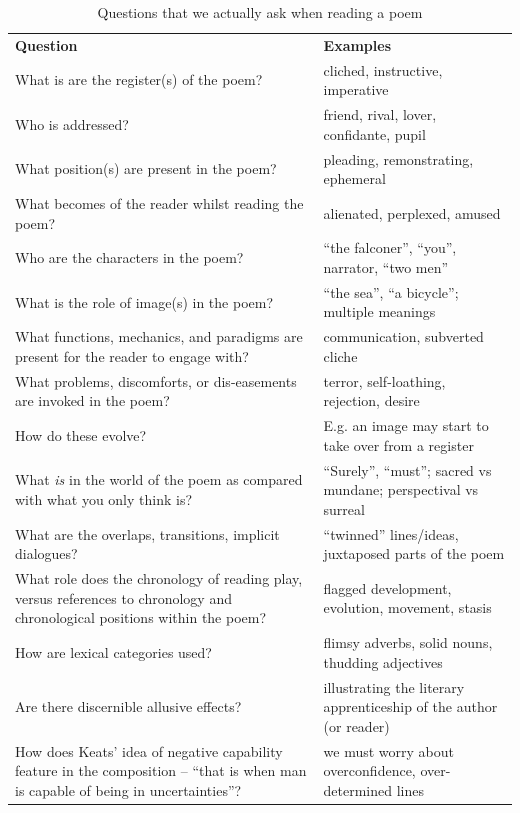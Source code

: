 \begin{table}
{\small
\def\arraystretch{1.2}
\begin{tabular}{p{1.8in}p{1.1in}}
\textbf{Question} & \textbf{Examples} \\[.1cm]
What is are the register(s) of the poem? & cliched, instructive, imperative\\
Who is addressed? & friend, rival, lover, confidante, pupil\\
What position(s) are present in the poem? & pleading, remonstrating, ephemeral\\
What becomes of the reader whilst reading the poem? & alienated, perplexed, amused\\
Who are the characters in the poem? & ``the falconer'', ``you'', narrator, ``two men'' \\
What is the role of image(s) in the poem? & ``the sea'', ``a bicycle''; multiple meanings\\
What functions, mechanics, and paradigms are present for the reader to engage with? & communication, subverted cliche\\
What problems, discomforts, or dis-easements are invoked in the poem? & terror, self-loathing, rejection, desire \\
How do these evolve? & E.g. an image may start to take over from a register \\
What \emph{is} in the world of the poem as compared with what you only think is? & ``Surely'', ``must''; sacred vs mundane; perspectival vs surreal \\
What are the overlaps, transitions, implicit dialogues? & ``twinned'' lines/ideas, juxtaposed parts of the poem\\
What role does the chronology of reading play, versus references to chronology and chronological positions within the poem? & flagged development, evolution, movement, stasis\\
How are lexical categories used? & flimsy adverbs, solid nouns, thudding adjectives\\
Are there discernible allusive effects? & illustrating the literary apprenticeship of the author (or reader)\\
How does Keats' idea of negative capability feature in the composition -- ``that is when man is capable of being in uncertainties''? & we must worry about overconfidence, over-determined lines\\
\end{tabular}
}

\caption{Questions that we actually ask when reading a poem\label{tab:questions_for_human_readers}}
\end{table}

